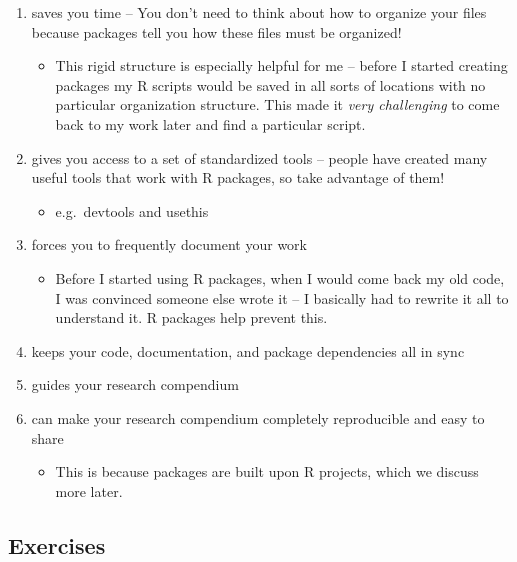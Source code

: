 \documentclass[
]{book}
\providecommand{\tightlist}{%
  \setlength{\itemsep}{0pt}\setlength{\parskip}{0pt}}
\begin{document}
\begin{enumerate}
\def\labelenumi{\arabic{enumi}.}
\tightlist
\item
  saves you time -- You don't need to think about how to organize your files because packages tell you how these files must be organized!

  \begin{itemize}
  \tightlist
  \item
    This rigid structure is especially helpful for me -- before I started creating packages my R scripts would be saved in all sorts of locations with no particular organization structure. This made it \emph{very challenging} to come back to my work later and find a particular script.
  \end{itemize}
\item
  gives you access to a set of standardized tools -- people have created many useful tools that work with R packages, so take advantage of them!

  \begin{itemize}
  \tightlist
  \item
    e.g.~devtools and usethis
  \end{itemize}
\item
  forces you to frequently document your work

  \begin{itemize}
  \tightlist
  \item
    Before I started using R packages, when I would come back my old code, I was convinced someone else wrote it -- I basically had to rewrite it all to understand it. R packages help prevent this.
  \end{itemize}
\item
  keeps your code, documentation, and package dependencies all in sync
\item
  guides your research compendium
\item
  can make your research compendium completely reproducible and easy to share

  \begin{itemize}
  \tightlist
  \item
    This is because packages are built upon R projects, which we discuss more later.
  \end{itemize}
\end{enumerate}

\hypertarget{ex-set1}{%
\subsection{Exercises}\label{ex-set1}}
\end{document}
